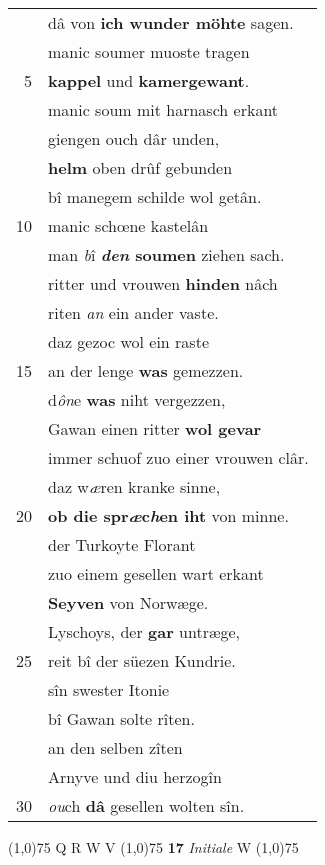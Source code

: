 \documentclass[8pt,a4paper,notitlepage]{article}
\begin{document}
\begin{table}[ht]
\begin{minipage}[t]{0.5\linewidth}
\begin{tabular}{rl}
 & dâ von \textbf{ich wunder möhte} sagen.\\ 
 & manic soumer muoste tragen\\ 
5 & \textbf{kappel} und \textbf{kamergewant}.\\ 
 & manic soum mit harnasch erkant\\ 
 & giengen ouch dâr unden,\\ 
 & \textbf{helm} oben drûf gebunden\\ 
 & bî manegem schilde wol getân.\\ 
10 & manic schœne kastelân\\ 
 & man \textit{b}î \textbf{\textit{den} soumen} ziehen sach.\\ 
 & ritter und vrouwen \textbf{hinden} nâch\\ 
 & riten \textit{an} ein ander vaste.\\ 
 & daz gezoc wol ein raste\\ 
15 & an der lenge \textbf{was} gemezzen.\\ 
 & d\textit{ôn}e \textbf{was} niht vergezzen,\\ 
 & Gawan einen ritter \textbf{wol gevar}\\ 
 & immer schuof zuo einer vrouwen clâr.\\ 
 & daz w\textit{æ}ren kranke sinne,\\ 
20 & \textbf{ob die spr\textit{æ}c\textit{h}en iht} von minne.\\ 
 & der Turkoyte Florant\\ 
 & zuo einem gesellen wart erkant\\ 
 & \textbf{Seyven} von Norwæge.\\ 
 & Lyschoys, der \textbf{gar} untræge,\\ 
25 & reit bî der süezen Kundrie.\\ 
 & sîn swester Itonie\\ 
 & bî Gawan solte rîten.\\ 
 & an den selben zîten\\ 
 & Arnyve und diu herzogîn\\ 
30 & \textit{ou}ch \textbf{dâ} gesellen wolten sîn.\\ 
\end{tabular}
\scriptsize
\line(1,0){75} \newline
Q R W V \newline
\line(1,0){75} \newline
\textbf{17} \textit{Initiale} W  \newline
\line(1,0){75} \newline

\end{minipage}
\end{table}
\end{document}
